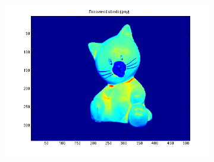 \documentclass{paper}
\begin{document}
\begin{figure}[h!]
\begin{subfigure}{0.3\textwidth}
        \includegraphics[width=\textwidth]{results/cat/cat_rec_a}
    \end{subfigure}
    

\end{figure}
\end{document}
